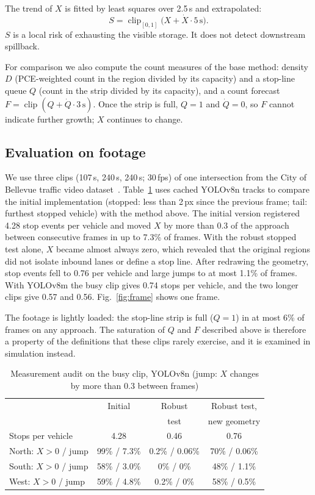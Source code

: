\documentclass[journal]{IEEEtran}
\begin{document}
The trend of $X$ is fitted by least squares over 2.5\,s and extrapolated:
\begin{equation}
S=\operatorname{clip}_{[0,1]}\bigl(X+\dot X\cdot 5\,\mathrm{s}\bigr).
\end{equation}
$S$ is a local risk of exhausting the visible storage. It does not detect downstream
spillback.

For comparison we also compute the count measures of the base method: density
$D$ (PCE-weighted count in the region divided by its capacity) and a stop-line queue
$Q$ (count in the strip divided by its capacity), and a count forecast
$F=\operatorname{clip}(Q+\dot Q\cdot 3\,\mathrm{s})$. Once the strip is full, $Q=1$ and
$\dot Q=0$, so $F$ cannot indicate further growth; $X$ continues to change.

\subsection{Evaluation on footage}
We use three clips (107\,s, 240\,s, 240\,s; 30\,fps) of one intersection from the City
of Bellevue traffic video dataset~\cite{bellevue}. Table~\ref{tab:measure} uses cached YOLOv8n tracks to compare the initial implementation (stopped: less than 2\,px since the previous frame; tail: furthest
stopped vehicle) with the method above. The initial version registered 4.28 stop events
per vehicle and moved $X$ by more than 0.3 of the approach between consecutive frames in
up to 7.3\% of frames. With the robust stopped test alone, $X$ became almost always zero,
which revealed that the original regions did not isolate inbound lanes or define a stop
line. After redrawing the geometry, stop events fell to 0.76 per vehicle and large jumps
to at most 1.1\% of frames. With YOLOv8m the busy clip gives 0.74 stops per vehicle, and the two longer clips give 0.57 and 0.56. Fig.~\ref{fig:frame} shows one frame.

The footage is lightly loaded: the stop-line strip is full ($Q=1$) in at most 6\% of frames
on any approach. The saturation of $Q$ and $F$ described above is therefore a property
of the definitions that these clips rarely exercise, and it is examined in simulation
instead.

\begin{table}[t]
\caption{Measurement audit on the busy clip, YOLOv8n (jump: $X$ changes by more than 0.3 between frames)}
\label{tab:measure}
\centering
\setlength{\tabcolsep}{3pt}
\begin{tabular}{lccc}
\toprule
 & Initial & Robust & Robust test,\\
 &         & test   & new geometry\\
\midrule
Stops per vehicle & 4.28 & 0.46 & 0.76\\
North: $X>0$ / jump & 99\% / 7.3\% & 0.2\% / 0.06\% & 70\% / 0.06\%\\
South: $X>0$ / jump & 58\% / 3.0\% & 0\% / 0\% & 48\% / 1.1\%\\
West: $X>0$ / jump & 59\% / 4.8\% & 0.2\% / 0\% & 58\% / 0.5\%\\
\bottomrule
\end{tabular}
\end{table}
\end{document}
